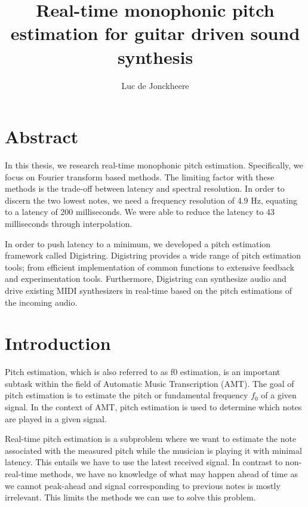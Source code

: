 \documentclass[a4paper,10pt,twocolumn]{article}
\title{\textbf{Real-time monophonic pitch estimation for guitar driven sound synthesis}}
\author{Luc de Jonckheere}
\begin{document}

\ifdefined\notitle
\else
    \maketitle
\fi


\section*{Abstract}
In this thesis, we research real-time monophonic pitch estimation. Specifically, we focus on Fourier transform based methods. The limiting factor with these methods is the trade-off between latency and spectral resolution. In order to discern the two lowest notes, we need a frequency resolution of 4.9 Hz, equating to a latency of 200 milliseconds. We were able to reduce the latency to 43 milliseconds through interpolation.

In order to push latency to a minimum, we developed a pitch estimation framework called Digistring. Digistring provides a wide range of pitch estimation tools; from efficient implementation of common functions to extensive feedback and experimentation tools. Furthermore, Digistring can synthesize audio and drive existing MIDI synthesizers in real-time based on the pitch estimations of the incoming audio.


\tableofcontents
\vfill


\section{Introduction}
Pitch estimation, which is also referred to as f0 estimation, is an important subtask within the field of Automatic Music Transcription (AMT). The goal of pitch estimation is to estimate the pitch or fundamental frequency $f_0$ of a given signal. In the context of AMT, pitch estimation is used to determine which notes are played in a given signal.

Real-time pitch estimation is a subproblem where we want to estimate the note associated with the measured pitch while the musician is playing it with minimal latency. This entails we have to use the latest received signal. In contrast to non-real-time methods, we have no knowledge of what may happen ahead of time as we cannot peak-ahead and signal corresponding to previous notes is mostly irrelevant. This limits the methods we can use to solve this problem.
\end{document}
